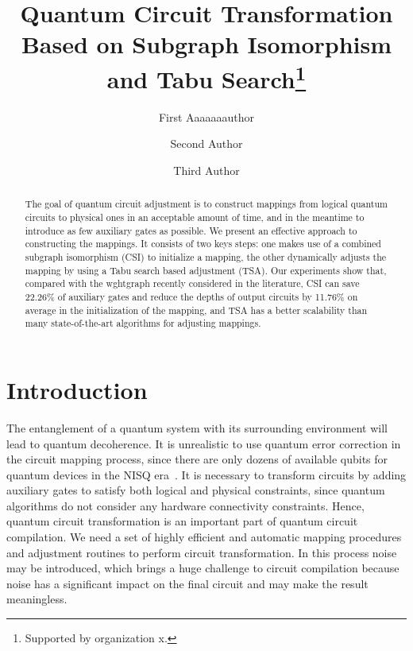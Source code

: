 \documentclass[runningheads]{llncs}
\begin{document}
%
\title{ Quantum Circuit Transformation Based on Subgraph Isomorphism and Tabu Search\thanks{Supported by organization x.}}

\author{First Aaaaaaauthor \and
Second Author \and
Third Author}
%

%
\maketitle              %
%
\begin{abstract}
	The goal of quantum circuit adjustment is to construct mappings from logical quantum circuits to physical ones in an acceptable amount of time, and in the meantime to introduce  as few auxiliary gates as possible. We present an effective approach to constructing the mappings. It consists of two keys steps: one makes use of a combined subgraph isomorphism (CSI) to initialize a mapping, the other dynamically adjusts the mapping by using a Tabu search based adjustment (TSA). Our experiments show that, compared with the wghtgraph recently considered in the literature, CSI can save 22.26\% of auxiliary gates and reduce the depths of output circuits by 11.76\% on average in the initialization of the mapping, and  TSA has a better scalability than many state-of-the-art algorithms for adjusting mappings.
	
	
\end{abstract}

\section{Introduction}
\label{Introduction}
The entanglement of a quantum system with its surrounding environment will lead to quantum decoherence. It is unrealistic to use quantum error correction in the circuit mapping process, since there are only dozens of available qubits for quantum devices in the NISQ era~\cite{2018QuantumPreskill}. It is necessary to transform circuits by adding auxiliary gates to satisfy both logical and physical constraints, since quantum algorithms do not consider any hardware connectivity constraints. Hence, quantum circuit transformation is an important part of quantum circuit compilation. We need a set of highly efficient and automatic mapping procedures and adjustment routines to perform circuit transformation. In this process noise may be introduced, which brings a huge challenge to circuit compilation because noise has a significant impact on the final circuit and may make the result meaningless. 
\end{document}
